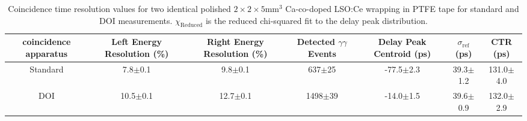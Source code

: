\begin{table}
\caption{\label{tab:referencevals} Coincidence time resolution values for two identical polished $2\times2\times5$mm$^3$ Ca-co-doped LSO:Ce wrapping in PTFE tape for standard and DOI measurements. $\chi_\text{Reduced}$ is the reduced chi-squared fit to the delay peak distribution.}
\begin{tabular}{ccccccc}
coincidence apparatus & Left Energy Resolution (\%) & Right Energy Resolution (\%) & Detected $\gamma\gamma$ Events & Delay Peak Centroid (ps) & $\sigma_\textrm{ref}$ (ps) & CTR (ps)\\
\hline
Standard &   7.8$\pm$0.1 &   9.8$\pm$0.1 &   637$\pm$25 &  -77.5$\pm$2.3 &   39.3$\pm$1.2 &  131.0$\pm$4.0 \\
     DOI &  10.5$\pm$0.1 &  12.7$\pm$0.1 &  1498$\pm$39 &  -14.0$\pm$1.5 &   39.6$\pm$0.9 &  132.0$\pm$2.9 \\
\hline
\end{tabular}
\end{table}
